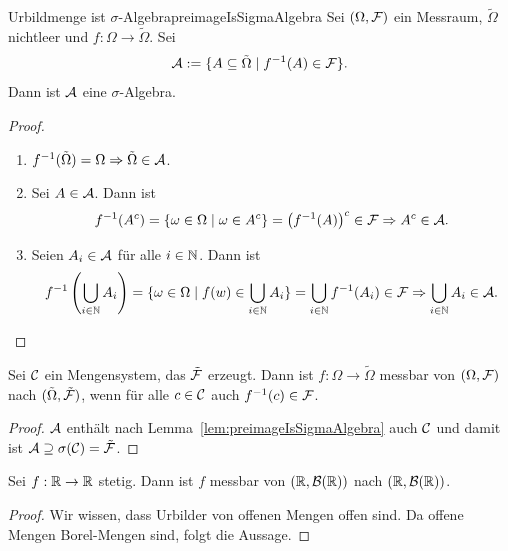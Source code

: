 \documentclass[language=ngerman]{../../Template/TemplateLecture}
\begin{document}
\begin{lem}{Urbildmenge ist $\sigma$-Algebra}{preimageIsSigmaAlgebra}
    Sei $(\Omega, \mathcal{F})$ ein Messraum, $\tilde{\Omega}$ nichtleer und $f: \Omega \to \tilde{\Omega}$. Sei
    \begin{equation}
        \mathcal{A} := \{A \subseteq \tilde{\Omega} \mid f^{-1}(A) \in \mathcal{F}\}.
    \end{equation}
    Dann ist $\mathcal{A}$ eine $\sigma$-Algebra.
\end{lem}
\begin{proof}\leavevmode
    \begin{enumerate}[$(i)$]
        \item $f^{-1}(\tilde{\Omega}) = \Omega \Rightarrow \tilde{\Omega} \in \mathcal{A}$.
        \item Sei $A \in \mathcal{A}$. Dann ist 
        \begin{equation}
            f^{-1}(A^c) = \{\omega \in \Omega \mid \omega \in A^c\} = \left(f^{-1}(A)\right)^c \in \mathcal{F} \Rightarrow A^c \in \mathcal{A}.
        \end{equation}
        \item Seien $A_i \in \mathcal{A}$ für alle $i \in \mathbb{N}$. Dann ist 
        \begin{equation}
            f^{-1}\left(\bigcup_{i \in \mathbb{N}} A_i\right) = \{\omega \in \Omega \mid f(w) \in \bigcup_{i \in \mathbb{N}} A_i\} = \bigcup_{i \in \mathbb{N}} f^{-1}(A_i) \in \mathcal{F} \Rightarrow \bigcup_{i \in \mathbb{N}} A_i \in \mathcal{A}.
        \end{equation}
    \end{enumerate}
\end{proof}



\begin{corollary}\label{cor:setSystemMeasurable}
    Sei $\mathcal{C}$ ein Mengensystem, das $\tilde{\mathcal{F}}$ erzeugt. Dann ist $f: \Omega \to \tilde{\Omega}$ messbar von $(\Omega, \mathcal{F})$ nach $(\tilde{\Omega},\tilde{\mathcal{F}})$, wenn für alle $c \in \mathcal{C}$ auch $f^{-1}(c) \in \mathcal{F}$.
\end{corollary}


\begin{proof}
    $\mathcal{A}$ enthält nach Lemma~\ref{lem:preimageIsSigmaAlgebra} auch $\mathcal{C}$ und damit ist $\mathcal{A} \supseteq \sigma(\mathcal{C}) = \tilde{\mathcal{F}}$.
\end{proof}

\begin{corollary}
    Sei $f: \mathbb{R} \to \mathbb{R}$ stetig. Dann ist $f$ messbar von $(\mathbb{R}, \mathcal{B}(\mathbb{R}))$ nach $(\mathbb{R}, \mathcal{B}(\mathbb{R}))$.
\end{corollary}
\begin{proof}
    Wir wissen, dass Urbilder von offenen Mengen offen sind. Da offene Mengen Borel-Mengen sind, folgt die Aussage.
\end{proof}
\end{document}
